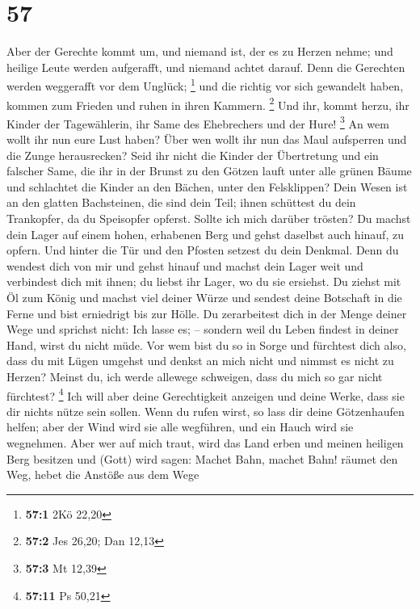 \hypertarget{section-21}{%
\section{57}\label{section-21}}

 Aber der Gerechte kommt um, und niemand ist, der es zu
Herzen nehme; und heilige Leute werden aufgerafft, und niemand achtet
darauf. Denn die Gerechten werden weggerafft vor dem Unglück;
\footnote{\textbf{57:1} 2Kö 22,20}  und die richtig vor sich
gewandelt haben, kommen zum Frieden und ruhen in ihren Kammern.
\footnote{\textbf{57:2} Jes 26,20; Dan 12,13}  Und ihr,
kommt herzu, ihr Kinder der Tagewählerin, ihr Same des Ehebrechers und
der Hure! \footnote{\textbf{57:3} Mt 12,39}  An wem wollt
ihr nun eure Lust haben? Über wen wollt ihr nun das Maul aufsperren und
die Zunge herausrecken? Seid ihr nicht die Kinder der Übertretung und
ein falscher Same,  die ihr in der Brunst zu den Götzen
lauft unter alle grünen Bäume und schlachtet die Kinder an den Bächen,
unter den Felsklippen?  Dein Wesen ist an den glatten
Bachsteinen, die sind dein Teil; ihnen schüttest du dein Trankopfer, da
du Speisopfer opferst. Sollte ich mich darüber trösten?  Du
machst dein Lager auf einem hohen, erhabenen Berg und gehst daselbst
auch hinauf, zu opfern.  Und hinter die Tür und den Pfosten
setzest du dein Denkmal. Denn du wendest dich von mir und gehst hinauf
und machst dein Lager weit und verbindest dich mit ihnen; du liebst ihr
Lager, wo du sie ersiehst.  Du ziehst mit Öl zum König und
machst viel deiner Würze und sendest deine Botschaft in die Ferne und
bist erniedrigt bis zur Hölle.  Du zerarbeitest dich in der
Menge deiner Wege und sprichst nicht: Ich lasse es; -- sondern weil du
Leben findest in deiner Hand, wirst du nicht müde.  Vor wem
bist du so in Sorge und fürchtest dich also, dass du mit Lügen umgehst
und denkst an mich nicht und nimmst es nicht zu Herzen? Meinst du, ich
werde allewege schweigen, dass du mich so gar nicht fürchtest?
\footnote{\textbf{57:11} Ps 50,21}  Ich will aber deine
Gerechtigkeit anzeigen und deine Werke, dass sie dir nichts nütze sein
sollen.  Wenn du rufen wirst, so lass dir deine
Götzenhaufen helfen; aber der Wind wird sie alle wegführen, und ein
Hauch wird sie wegnehmen. Aber wer auf mich traut, wird das Land erben
und meinen heiligen Berg besitzen  und (Gott) wird sagen:
Machet Bahn, machet Bahn! räumet den Weg, hebet die Anstöße aus dem Wege
